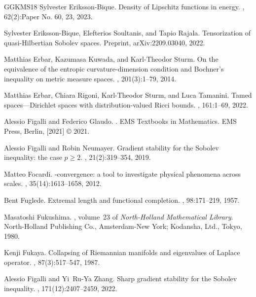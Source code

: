 \documentclass[11pt]{article}
\numberwithin{equation}{section}
\begin{document}
{\begin{thebibliography}{GGKMS18}
Sylvester Eriksson-Bique.
\newblock Density of {L}ipschitz functions in energy.
, 62(2):Paper No. 60,
  23, 2023.

Sylvester Eriksson-Bique, Elefterios Soultanis, and Tapio Rajala.
\newblock Tensorization of quasi-{H}ilbertian {S}obolev spaces.
\newblock Preprint, arXiv:2209.03040, 2022.

Matthias Erbar, Kazumasa Kuwada, and Karl-Theodor Sturm.
\newblock On the equivalence of the entropic curvature-dimension condition and
  {B}ochner's inequality on metric measure spaces.
, 201(3):1--79, 2014.

Matthias Erbar, Chiara Rigoni, Karl-Theodor Sturm, and Luca Tamanini.
\newblock Tamed spaces---{D}irichlet spaces with distribution-valued {R}icci
  bounds.
, 161:1--69, 2022.

Alessio Figalli and Federico Glaudo.
.
\newblock EMS Textbooks in Mathematics. EMS Press, Berlin, [2021] \copyright
  2021.

Alessio Figalli and Robin Neumayer.
\newblock Gradient stability for the {S}obolev inequality: the case {$p\geq
  2$}.
, 21(2):319--354, 2019.

Matteo Focardi.
\newblock {$\Gamma$}-convergence: a tool to investigate physical phenomena
  across scales.
, 35(14):1613--1658, 2012.

Bent Fuglede.
\newblock Extremal length and functional completion.
, 98:171--219, 1957.

Masatoshi Fukushima.
, volume~23 of {\em
  North-Holland Mathematical Library}.
\newblock North-Holland Publishing Co., Amsterdam-New York; Kodansha, Ltd.,
  Tokyo, 1980.

Kenji Fukaya.
\newblock Collapsing of {R}iemannian manifolds and eigenvalues of {L}aplace
  operator.
, 87(3):517--547, 1987.

Alessio Figalli and Yi~Ru-Ya Zhang.
\newblock Sharp gradient stability for the {S}obolev inequality.
, 171(12):2407--2459, 2022.


\end{thebibliography}}
\end{document}
